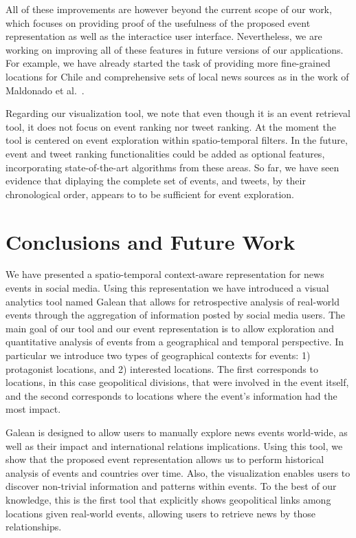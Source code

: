 All of these improvements are however beyond the current scope of our work,
which focuses on providing proof of the usefulness of the proposed event
representation as well as the interactice user interface.
Nevertheless, we are working on improving all of these
features in future versions of our applications.  For example, we have
already started the task of providing more fine-grained locations for Chile
and comprehensive sets of local news sources as in the work of Maldonado et
al.~\cite{maldonado_2015}.

Regarding our visualization tool, we note that even though it is an event
retrieval tool, it does not focus on event ranking nor tweet
ranking. At the moment the tool is centered on
event exploration within spatio-temporal filters. In the
future, event and tweet ranking functionalities could be added as
optional features, incorporating state-of-the-art algorithms from these areas. So
far, we have seen evidence that diplaying the complete set of events, and tweets, by their chronological
order, appears to to be sufficient for event exploration.


\section{Conclusions and Future Work} \label{sec:conclusions}
We have presented a spatio-temporal context-aware representation for news
events in social media. Using this representation we have introduced a
visual analytics tool named Galean that allows
for retrospective analysis of real-world events
through the aggregation of information posted by social media users. The
main goal of our tool and our event representation is to allow exploration
and quantitative analysis of events
from a geographical and temporal perspective. In particular we
introduce two types of geographical contexts for events: 1) protagonist
locations, and 2) interested locations. The first corresponds to
locations, in this case geopolitical divisions, that were involved in
the event itself, and the second corresponds to locations where the event's
information had the most impact.

Galean is designed to allow users to manually explore news events world-wide, as well as their impact and
international relations implications. Using this tool, we show that the proposed event representation
allows us to perform historical analysis of events and countries over time.
Also, the visualization enables users to discover non-trivial information
and patterns within events. To the best of our
knowledge, this is the first tool that explicitly shows geopolitical links
among locations given real-world events, allowing users to retrieve
news by those relationships.

